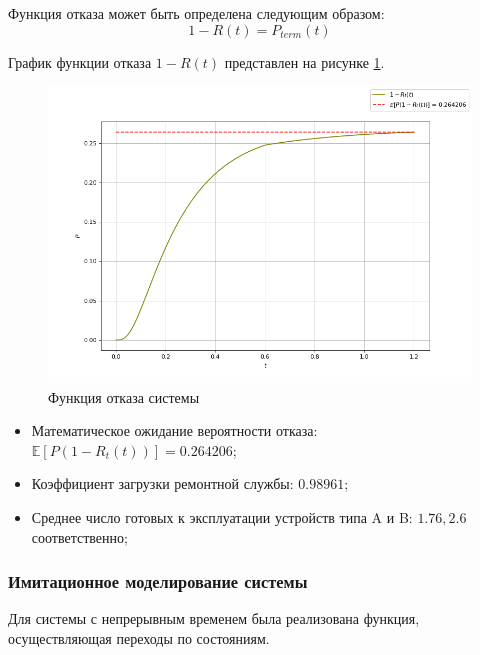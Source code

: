 Функция отказа может быть определена следующим образом:
$$1-R(t) = P_{term}(t)$$

График функции отказа $1-R(t)$ представлен на рисунке \ref{R_t}.
\begin{figure}[H]
\centerline{\includegraphics[width=\textwidth]{Images/R_t.png}}
\caption{Функция отказа системы}
\label{R_t}
\end{figure}

\begin{itemize}
    \item Математическое ожидание вероятности отказа:
$\mathbb{E}[P(1-R_t(t))]=0.264206 $;
\item Коэффициент загрузки ремонтной службы: $0.98961$;
\item Среднее число готовых к эксплуатации устройств типа  A и B: $1.76, 2.6$ соответственно;
\end{itemize}

\subsubsection{Имитационное моделирование системы}

Для системы с непрерывным временем была реализована функция, осуществляющая переходы по состояниям.

